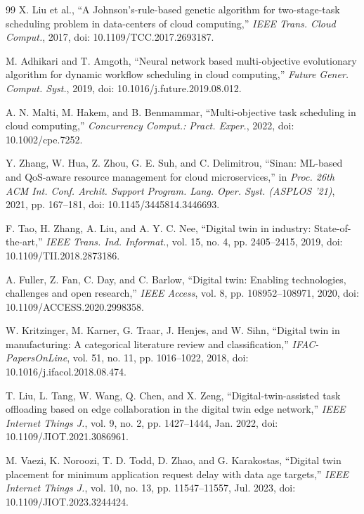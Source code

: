 \documentclass[conference]{IEEEtran}
\begin{document}
\begin{thebibliography}{99}
 X. Liu et al., ``A Johnson's-rule-based genetic algorithm for two-stage-task scheduling problem in data-centers of cloud computing,'' \textit{IEEE Trans. Cloud Comput.}, 2017, doi: 10.1109/TCC.2017.2693187.

 M. Adhikari and T. Amgoth, ``Neural network based multi-objective evolutionary algorithm for dynamic workflow scheduling in cloud computing,'' \textit{Future Gener. Comput. Syst.}, 2019, doi: 10.1016/j.future.2019.08.012.

 A. N. Malti, M. Hakem, and B. Benmammar, ``Multi-objective task scheduling in cloud computing,'' \textit{Concurrency Comput.: Pract. Exper.}, 2022, doi: 10.1002/cpe.7252.

 Y. Zhang, W. Hua, Z. Zhou, G. E. Suh, and C. Delimitrou, ``Sinan: ML-based and QoS-aware resource management for cloud microservices,'' in \textit{Proc. 26th ACM Int. Conf. Archit. Support Program. Lang. Oper. Syst. (ASPLOS '21)}, 2021, pp. 167--181, doi: 10.1145/3445814.3446693.

 F. Tao, H. Zhang, A. Liu, and A. Y. C. Nee, ``Digital twin in industry: State-of-the-art,'' \textit{IEEE Trans. Ind. Informat.}, vol. 15, no. 4, pp. 2405--2415, 2019, doi: 10.1109/TII.2018.2873186.

 A. Fuller, Z. Fan, C. Day, and C. Barlow, ``Digital twin: Enabling technologies, challenges and open research,'' \textit{IEEE Access}, vol. 8, pp. 108952--108971, 2020, doi: 10.1109/ACCESS.2020.2998358.

 W. Kritzinger, M. Karner, G. Traar, J. Henjes, and W. Sihn, ``Digital twin in manufacturing: A categorical literature review and classification,'' \textit{IFAC-PapersOnLine}, vol. 51, no. 11, pp. 1016--1022, 2018, doi: 10.1016/j.ifacol.2018.08.474.

 T. Liu, L. Tang, W. Wang, Q. Chen, and X. Zeng, ``Digital-twin-assisted task offloading based on edge collaboration in the digital twin edge network,'' \textit{IEEE Internet Things J.}, vol. 9, no. 2, pp. 1427--1444, Jan. 2022, doi: 10.1109/JIOT.2021.3086961.

 M. Vaezi, K. Noroozi, T. D. Todd, D. Zhao, and G. Karakostas, ``Digital twin placement for minimum application request delay with data age targets,'' \textit{IEEE Internet Things J.}, vol. 10, no. 13, pp. 11547--11557, Jul. 2023, doi: 10.1109/JIOT.2023.3244424.


\end{thebibliography}
\end{document}
